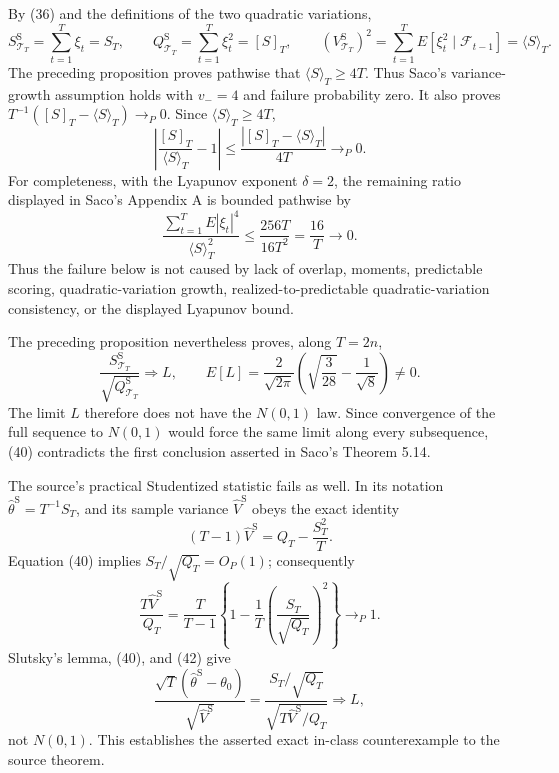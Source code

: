 By (36) and the definitions of the two quadratic variations,
\[
 S_{\mathcal T_T}^{\mathrm S}=\sum_{t=1}^T\xi_t=S_T,\qquad
 Q_{\mathcal T_T}^{\mathrm S}=\sum_{t=1}^T\xi_t^2=[S]_T,\qquad
 (V_{\mathcal T_T}^{\mathrm S})^2=\sum_{t=1}^TE[\xi_t^2\mid\mathcal F_{t-1}]=\langle S\rangle_T.
\tag{37}
\]
The preceding proposition proves pathwise that \(\langle S\rangle_T\ge4T\). Thus Saco's variance-growth assumption holds with \(v_-=4\) and failure probability zero. It also proves \(T^{-1}([S]_T-\langle S\rangle_T)\to_P0\). Since \(\langle S\rangle_T\ge4T\),
\[
 \left|\frac{[S]_T}{\langle S\rangle_T}-1\right|
 \le\frac{|[S]_T-\langle S\rangle_T|}{4T}\to_P0.
\tag{38}
\]
For completeness, with the Lyapunov exponent \(\delta=2\), the remaining ratio displayed in Saco's Appendix A is bounded pathwise by
\[
 \frac{\sum_{t=1}^TE|\xi_t|^4}{\langle S\rangle_T^2}
 \le\frac{256T}{16T^2}=\frac{16}{T}\longrightarrow0.
\tag{39}
\]
Thus the failure below is not caused by lack of overlap, moments, predictable scoring, quadratic-variation growth, realized-to-predictable quadratic-variation consistency, or the displayed Lyapunov bound.

The preceding proposition nevertheless proves, along \(T=2n\),
\[
 \frac{S_{\mathcal T_T}^{\mathrm S}}{\sqrt{Q_{\mathcal T_T}^{\mathrm S}}}\Longrightarrow L,\qquad
 E[L]=\frac2{\sqrt{2\pi}}\left(\sqrt{\frac3{28}}-\frac1{\sqrt8}\right)\ne0.
\tag{40}
\]
The limit \(L\) therefore does not have the \(N(0,1)\) law. Since convergence of the full sequence to \(N(0,1)\) would force the same limit along every subsequence, (40) contradicts the first conclusion asserted in Saco's Theorem 5.14.

The source's practical Studentized statistic fails as well. In its notation \(\widehat\theta^{\mathrm S}=T^{-1}S_T\), and its sample variance \(\widehat V^{\mathrm S}\) obeys the exact identity
\[
 (T-1)\widehat V^{\mathrm S}=Q_T-\frac{S_T^2}{T}.
\tag{41}
\]
Equation (40) implies \(S_T/\sqrt{Q_T}=O_P(1)\); consequently
\[
 \frac{T\widehat V^{\mathrm S}}{Q_T}
 =\frac{T}{T-1}\left\{1-\frac1T\left(\frac{S_T}{\sqrt{Q_T}}\right)^2\right\}\to_P1.
\tag{42}
\]
Slutsky's lemma, (40), and (42) give
\[
 \frac{\sqrt T(\widehat\theta^{\mathrm S}-\theta_0)}{\sqrt{\widehat V^{\mathrm S}}}
 =\frac{S_T/\sqrt{Q_T}}{\sqrt{T\widehat V^{\mathrm S}/Q_T}}\Longrightarrow L,
\tag{43}
\]
not \(N(0,1)\). This establishes the asserted exact in-class counterexample to the source theorem.